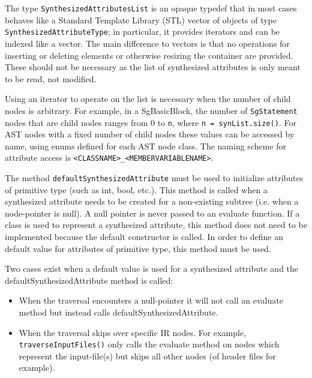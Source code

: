    The type {\tt SynthesizedAttributesList} is an opaque typedef that in most
cases behaves like a Standard Template Library (STL) vector of objects of type
{\tt SynthesizedAttributeType}; in particular, it provides iterators and can
be indexed like a vector. The main difference to vectors is that no
operations for inserting or deleting elements or otherwise resizing the
container are provided. These should not be necessary as the list of
synthesized attributes is only meant to be read, not modified.

Using an iterator to operate on the list is necessary when the number of child nodes
is arbitrary. For example, in a SgBasicBlock, the number of {\tt SgStatement} nodes that are
child nodes ranges from 0 to {\tt n}, where {\tt n = synList.size()}.
For AST nodes with a fixed number of child nodes these values can be accessed by name,
using enums defined for each AST node class. The naming scheme for attribute access is
{\tt <CLASSNAME>\_<MEMBERVARIABLENAME>}.

   The method {\tt defaultSynthesizedAttribute} must be used to initialize attributes of
primitive type (such as int, bool, etc.).  This method is called when a synthesized
attribute needs to be created for a non-existing subtree  (i.e. when a node-pointer is
null). A null pointer is never passed to an evaluate function. If a class is used to
represent a synthesized attribute, this method does not need to be implemented because
the default constructor is called. In order to define an default value for attributes
of primitive type, this method must be used.

   Two cases exist when a default value is used for a synthesized attribute
and the defaultSynthesizedAttribute method is called:
\begin{itemize}
\item When the traversal encounters a null-pointer it will not call an evaluate method but
      instead calls defaultSynthesizedAttribute.
\item When the traversal skips over specific IR nodes. For example, 
      {\tt traverseInputFiles()} only calls the evaluate method on nodes which represent
      the input-file(s) but skips all other nodes (of header files for example).
\end{itemize}


